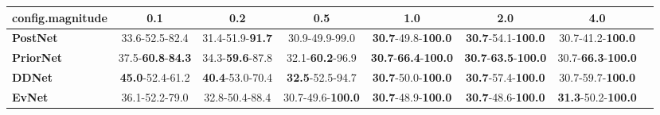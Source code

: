 \begin{tabular}{lccccccc}
\toprule
\textbf{config.magnitude} &                               0.1 &                      0.2 &                       0.5 &                                         1.0 &                                         2.0 &                                4.0 \\
\midrule
\textbf{PostNet } &                    33.6-52.5-82.4 &  31.4-51.9-\textbf{91.7} &            30.9-49.9-99.0 &           \textbf{30.7}-49.8-\textbf{100.0} &           \textbf{30.7}-54.1-\textbf{100.0} &           30.7-41.2-\textbf{100.0} \\
\textbf{PriorNet} &  37.5-\textbf{60.8}-\textbf{84.3} &  34.3-\textbf{59.6}-87.8 &   32.1-\textbf{60.2}-96.9 &  \textbf{30.7}-\textbf{66.4}-\textbf{100.0} &  \textbf{30.7}-\textbf{63.5}-\textbf{100.0} &  30.7-\textbf{66.3}-\textbf{100.0} \\
\textbf{DDNet   } &           \textbf{45.0}-52.4-61.2 &  \textbf{40.4}-53.0-70.4 &   \textbf{32.5}-52.5-94.7 &           \textbf{30.7}-50.0-\textbf{100.0} &           \textbf{30.7}-57.4-\textbf{100.0} &           30.7-59.7-\textbf{100.0} \\
\textbf{EvNet   } &                    36.1-52.2-79.0 &           32.8-50.4-88.4 &  30.7-49.6-\textbf{100.0} &           \textbf{30.7}-48.9-\textbf{100.0} &           \textbf{30.7}-48.6-\textbf{100.0} &  \textbf{31.3}-50.2-\textbf{100.0} \\
\bottomrule
\end{tabular}

